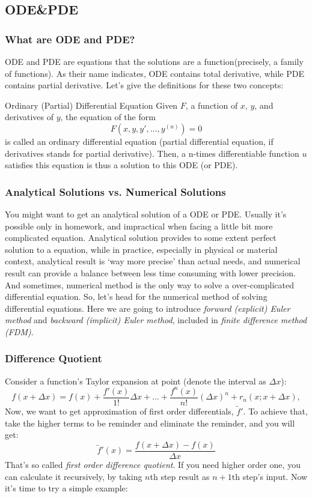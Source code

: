 \documentclass[compress,xcolor={dvipsnames}]{beamer}
\begin{document}
\subsection{ODE\&PDE}
\begin{frame}
    \frametitle{What are ODE and PDE?}
    ODE and PDE are equations that the solutions are a function(precisely, a family of functions). As their name indicates, ODE contains
    total derivative, while PDE contains partial derivative. Let's give the definitions for these two concepts:
    \begin{block}{Ordinary (Partial) Differential Equation}
        Given \(F\), a function of \(x\), \(y\), and derivatives of \(y\), the equation of the form
        \[F(x,y,y',\dots,y^{(n)}) = 0\]
        is called an ordinary differential equation (partial differential equation, if derivatives stands for partial derivative).
        Then, a n-times differentiable function \(u\) satisfies this equation is thus a solution to this ODE (or PDE).
    \end{block}
\end{frame}

\begin{frame}
    \frametitle{Analytical Solutions vs. Numerical Solutions}
    You might want to get an analytical solution of a ODE or PDE. Usually it's possible only in homework, and impractical when
    facing a little bit more complicated equation.
    \bigbreak
    Analytical solution provides to some extent perfect solution to a equation, while
    in practice, especially in physical or material context, analytical result is `way more precise' than actual needs, and numerical
    result can provide a balance between less time consuming with lower precision. And sometimes, numerical method is the only way to
    solve a over-complicated differential equation.
    \bigbreak
    \pause
    So, let's head for the numerical method of solving differential equations. Here we are going to introduce
    \emph{forward (explicit) Euler method} and \emph{backward (implicit) Euler method}, included in \emph{finite difference method (FDM)}.
\end{frame}

\begin{frame}
    \frametitle{Difference Quotient}
    Consider a function's Taylor expansion at point (denote the interval as \(\Delta x\)):
    \[
        f(x+\Delta x) = f(x) + \frac{f'(x)}{1!}\Delta x+\dots+\frac{f^{n}(x)}{n!}\left(\Delta x\right)^n+r_n(x;x+\Delta x),
    \]
    Now, we want to get approximation of first order differentials, \(\tilde{f}'\). To achieve that, take the higher terms to be reminder and eliminate the
    reminder, and you will get:
    \[ \tilde{f}'(x) = \frac{f(x+\Delta x) - f(x)}{\Delta x}  \]
    That's so called \emph{first order difference quotient}. If you need higher order one, you can calculate it recursively, by taking
    \(n\)th step result as \(n+1\)th step's input.
    \bigbreak
    \pause
    Now it's time to try a simple example:
\end{frame}
\end{document}
